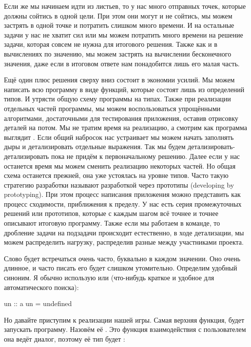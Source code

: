

Если же мы начинаем идти из листьев, то у нас много отправных
точек, которые должны сойтись в одной цели. При этом они
могут и не сойтись, мы можем застрять в одной точке и потратить
слишком много времени. И на остальные задачи у нас не хватит
сил или мы можем потратить много времени на решение задачи,
которая совсем не нужна для итогового решения. Также как и в 
вычислениях по значению, мы можем застрять на вычислении 
бесконечного значения, даже если в итоговом ответе нам понадобится
лишь его малая часть. 

Ещё один плюс решения сверху вниз состоит в экономии усилий.
Мы можем написать всю программу в виде функций, которые 
состоят лишь из определений типов. И утрясти общую схему
программы на типах. Также при реализации отдельных 
частей программы, мы можем воспользоваться упрощёнными
алгоритмами, достаточными для тестирования приложения, 
оставив отрисовку деталей на потом. 
Мы не тратим время на реализацию, а смотрим как
программа выглядит . Если общий набросок нас устраивает
мы можем начать заполнять дыры и детализировать отдельные
выражения. Так мы будем детализировать-детализировать 
пока не придём к первоначальному решению. Далее если у нас
останется время мы можем сменить реализацию некоторых частей. 
Но общая схема останется прежней, она уже устоялась на уровне
типов. Часто такую стратегию разработки называют разработкой
через прототипы (developing by prototyping). При этом процесс
написания приложения можно представить как процесс сходимости,
приближения к пределу. У нас есть серия промежуточных решений
или прототипов, которые с каждым шагом всё точнее и точнее
описывают итоговую программу. 
Также если мы работаем в команде, то дробление
задачи на подзадачи происходит естественно, в ходе детализации, 
мы можем распределить нагрузку, распределив разные 
между участниками проекта.

Слово  будет встречаться очень часто, 
буквально в каждом значении. Оно очень длинное,
и часто писать его будет слишком утомительно.
Определим удобный синоним. Я обычно использую
 или  (что-нибудь краткое и удобное для 
автоматического поиска):

\begin{code}
un :: a
un = undefined
\end{code}

Но давайте приступим к реализации нашей игры. Самая
верхняя функция, будет запускать программу. Назовём её
. Это функция взаимодействия с пользователем 
она ведёт диалог, поэтому её тип будет \mbox{}:

